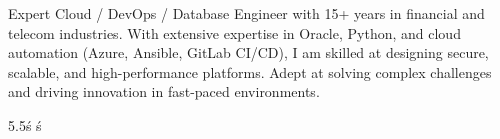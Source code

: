 \documentclass[9pt]{developercv} %
\begin{document}

\begin{minipage}[t]{0.4\textwidth} %
\vspace{-\baselineskip} %
Expert Cloud / DevOps / Database Engineer with 15+ years in financial and telecom industries. With extensive expertise in Oracle, Python, and cloud automation (Azure, Ansible, GitLab CI/CD), I am skilled at designing secure, scalable, and high-performance platforms. Adept at solving complex challenges and driving innovation in fast-paced environments.
\end{minipage}
\hfill %
\begin{minipage}[t]{0.5\textwidth} %
\vspace{-\baselineskip} %
\begin{barchart}{5.5}ś
ś
\end{barchart}
\end{minipage}


\end{document}
